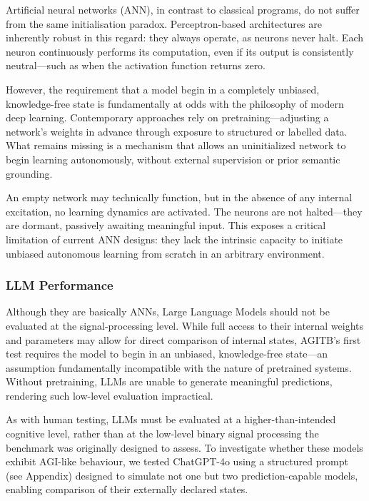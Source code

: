 \documentclass{article}
\begin{document}
Artificial neural networks (ANN), in contrast to classical programs, do not suffer from the same initialisation paradox. Perceptron-based architectures are inherently robust in this regard: they always operate, as neurons never halt. Each neuron continuously performs its computation, even if its output is consistently neutral—such as when the activation function returns zero.

However, the requirement that a model begin in a completely unbiased, knowledge-free state is fundamentally at odds with the philosophy of modern deep learning. Contemporary approaches rely on pretraining—adjusting a network’s weights in advance through exposure to structured or labelled data. What remains missing is a mechanism that allows an uninitialized network to begin learning autonomously, without external supervision or prior semantic grounding.

An empty network may technically function, but in the absence of any internal excitation, no learning dynamics are activated. The neurons are not halted—they are dormant, passively awaiting meaningful input. This exposes a critical limitation of current ANN designs: they lack the intrinsic capacity to initiate unbiased autonomous learning from scratch in an arbitrary environment.
 
\subsubsection{LLM Performance}

Although they are basically ANNs, Large Language Models should not be evaluated at the signal-processing level. While full access to their internal weights and parameters may allow for direct comparison of internal states, AGITB’s first test requires the model to begin in an unbiased, knowledge-free state—an assumption fundamentally incompatible with the nature of pretrained systems. Without pretraining, LLMs are unable to generate meaningful predictions, rendering such low-level evaluation impractical.

As with human testing, LLMs must be evaluated at a higher-than-intended cognitive level, rather than at the low-level binary signal processing the benchmark was originally designed to assess. To investigate whether these models exhibit AGI-like behaviour, we tested ChatGPT-4o using a structured prompt (see Appendix) designed to simulate not one but two prediction-capable models, enabling comparison of their externally declared states.
\end{document}
